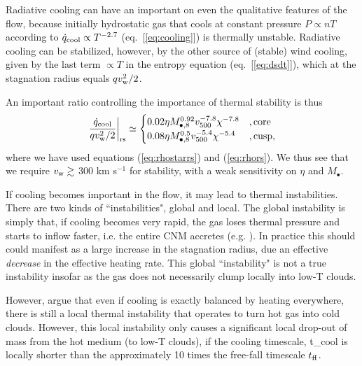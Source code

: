 \documentclass[usenatbib,fleqn]{mn2e}
\begin{document}
Radiative cooling can have an important on even the qualitative features of the flow, because initially hydrostatic gas that cools at constant pressure $P \propto nT$ according to $\dot{q}_{\rm cool} \propto T^{-2.7}$ (eq.~[\ref{eq:cooling}]) is thermally unstable.  Radiative cooling can be stabilized, however, by the other source of (stable) wind cooling, given by the last term $\propto T$ in the entropy equation (eq.~[\ref{eq:dsdt}]), which at the stagnation radius equals $q v_{\rm w}^{2}/2$.

An important ratio controlling the importance of thermal stability is thus
\begin{align}
\left.\frac{\dot{q}_{\rm cool}}{q v_{\rm w}^{2}/2}\right|_{\rm r{s}} \simeq
  \begin{cases}
   0.02\eta M_{\bullet,8}^{0.92}v_{500}^{-7.8}\chi^{-7.8}  &, \text{core}\\
   0.08\eta M_{\bullet,8}^{0.5}v_{500}^{-5.4}\chi^{-5.4}  &, \text{cusp},     
  \end{cases}
  \label{eq:cooling2}
\end{align}
where we have used equations (\ref{eq:rhostarrs}) and (\ref{eq:rhors}).  We thus see that we require $v_{\rm w} \gtrsim $ 300 km s$^{-1}$ for stability, with a weak sensitivity on $\eta$ and $M_{\bullet}$.  


If cooling becomes important in the flow, it may lead to thermal
instabilities.  There are two kinds of ``instabilities", global and
local.  The global instability is simply that, if cooling becomes very
rapid, the gas loses thermal pressure and starts to inflow faster,
i.e. the entire CNM accretes (e.g. ).  In
practice this should could manifest as a large increase in the
stagnation radius, due an effective {\it decrease} in the effective
heating rate.  This global ``instability" is not a true instability
insofar as the gas does not necessarily clump locally into low-T
clouds.

However, \citet{McCourt+12} argue that even if cooling is exactly balanced by heating everywhere, there is still a local thermal instability that operates to turn hot gas into cold clouds.  However, this local instability only causes a significant local drop-out of mass from the hot medium (to low-T clouds), if the cooling timescale,
\be
t_{\rm cool} \equiv {}
\ee 
is locally shorter than the approximately 10 times the free-fall timescale $t_{\rm ff}$. 
\end{document}

